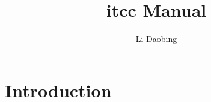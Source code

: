 \documentclass{book}
\begin{document}
\title{itcc Manual}
\author{Li Daobing}
\maketitle
\tableofcontents{}

\part{Introduction}
\label{part:intro}
\end{document}
